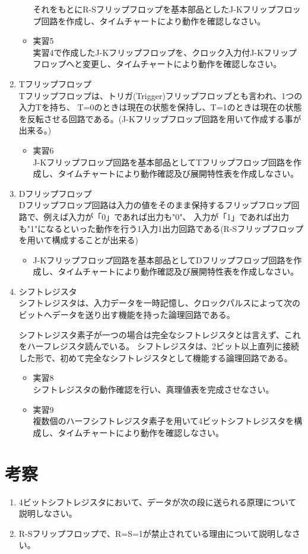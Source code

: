 \documentclass[dvipdfmx]{jsarticle}
\begin{document}
\begin{enumerate}
\begin{itemize}
						それをもとにR-Sフリップフロップを基本部品としたJ-Kフリップフロップ回路を作成し、タイムチャートにより動作を確認しなさい。
					\item 実習5 \\
						実習4で作成したJ-Kフリップフロップを、クロック入力付J-Kフリップフロップへと変更し、タイムチャートにより動作を確認しなさい。
				\end{itemize}
			\item Tフリップフロップ \\
				Tフリップフロップは、トリガ(Trigger)フリップフロップとも言われ、1つの入力Tを持ち、
				T=0のときは現在の状態を保持し、T=1のときは現在の状態を反転させる回路である。(J-Kフリップフロップ回路を用いて作成する事が出来る。)
				\begin{itemize}
					\item 実習6 \\
						J-Kフリップフロップ回路を基本部品としてTフリップフロップ回路を作成し、タイムチャートにより動作確認及び展開特性表を作成しなさい。
				\end{itemize}
			\item Dフリップフロップ \\
				Dフリップフロップ回路は入力の値をそのまま保持するフリップフロップ回路で、例えば入力が「0」であれば出力も"0"、
				入力が「1」であれば出力も"1"になるといった動作を行う1入力1出力回路である(R-Sフリップフロップを用いて構成することが出来る)
				\begin{itemize}
					\item J-Kフリップフロップ回路を基本部品としてDフリップフロップ回路を作成し、タイムチャートにより動作確認及び展開特性表を作成しなさい。
				\end{itemize}
			\item シフトレジスタ \\
				シフトレジスタは、入力データを一時記憶し、クロックパルスによって次のビットへデータを送り出す機能を持った論理回路である。\par
				シフトレジスタ素子が一つの場合は完全なシフトレジスタとは言えず、これをハーフレジスタ読んでいる。
				シフトレジスタは、2ビット以上直列に接続した形で、初めて完全なシフトレジスタとして機能する論理回路である。
				\begin{itemize}
					\item 実習8 \\
						シフトレジスタの動作確認を行い、真理値表を完成させなさい。
					\item 実習9 \\
						複数個のハーフシフトレジスタ素子を用いて4ビットシフトレジスタを構成し、タイムチャートにより動作を確認しなさい。
				\end{itemize}
		\end{enumerate}
	\section{考察}
		\begin{enumerate}
			\item 4ビットシフトレジスタにおいて、データが次の段に送られる原理について説明しなさい。
			\item R-Sフリップフロップで、R=S=1が禁止されている理由について説明しなさい。
		\end{enumerate}
\end{document}

